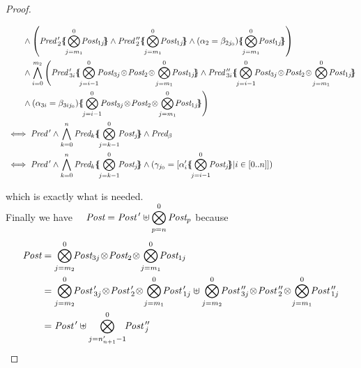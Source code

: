 \documentclass{lmcs}
\newcommand{\shortotimes}{\!\otimes\!}
\begin{document}
\begin{proof}
\begin{small}
\begin{equation*}
\begin{split}
&\qquad\land \left(\Pred\,'_{2}\subst{\bigotimes_{j=m_1}^{0}\!\!\Post_{1j}}
		\land {\Pred\,''_{2}} \subst{\bigotimes_{j=m_1}^{0}\!\!\Post_{1j}} \land (\alpha_{2}=\beta_{2j_0})\subst{\bigotimes_{j=m_1}^{0}\!\!\Post_{1j}} \right) \\
&\qquad\land\bigwedge_{i=0}^{m_2} \Bigg(\Pred\,'_{3i} \subst{\bigotimes_{j=i-1}^{0}\!\!\Post_{3j}\shortotimes\Post_2\shortotimes\bigotimes_{j=m_1}^{0}\!\!\Post_{1j}} 
		\land {\Pred\,''_{3i}} \subst{\bigotimes_{j=i-1}^{0}\!\!\Post_{3j}\shortotimes\Post_2\shortotimes\bigotimes_{j=m_1}^{0}\!\!\Post_{1j}}  \\
		 & \qquad \land (\alpha_{3i}=\beta_{3ij_0}) \subst{\bigotimes_{j=i-1}^{0}\!\!\Post_{3j}\shortotimes\Post_2\shortotimes\bigotimes_{j=m_1}^{0}\!\!\Post_{1j}}\Bigg)  \\
&\iff \Pred\,'\land\bigwedge_{k=0}^n\Pred_k\subst{\bigotimes_{j=k-1}^{0}\!\!\Post_{j}}\land\Pred_\beta
\\&\iff \Pred\,'\land\bigwedge_{k=0}^n\Pred_k\subst{\bigotimes_{j=k-1}^{0}\!\!\Post_{j}}\land
(\gamma_{j_0}=[\alpha'_{i}\subst{\bigotimes_{j=i-1}^{0}\!\!\Post_{j}}|i\in[0..n]])
\end{split}\end{equation*}
\end{small}
which is exactly what is needed.\\
Finally we have~~
$\Post=\displaystyle{\Post\,' \uplus \bigotimes_{p=n}^0
		\Post_p}$\quad
because
\begin{equation*}
\begin{split}
\Post&=\bigotimes_{j=m_2}^{0}\!\!\Post_{3j}\shortotimes\Post_2\shortotimes\bigotimes_{j=m_1}^{0}\!\!\Post_{1j}\\
&=\bigotimes_{j=m_2}^{0}\!\!\Post\,'_{3j}\shortotimes\Post\,'_2\shortotimes\bigotimes_{j=m_1}^{0}\!\!\Post\,'_{1j} \uplus \bigotimes_{j=m_2}^{0}\!\!\Post\,''_{3j}\shortotimes\Post\,''_2\shortotimes\bigotimes_{j=m_1}^{0}\!\!\Post\,''_{1j}\\
&=\Post\,' \uplus \bigotimes_{j=n'_{n+1}-1}^{0}\!\!\Post\,''_{j}
\end{split}
\end{equation*}
%

\end{proof}
\end{document}
